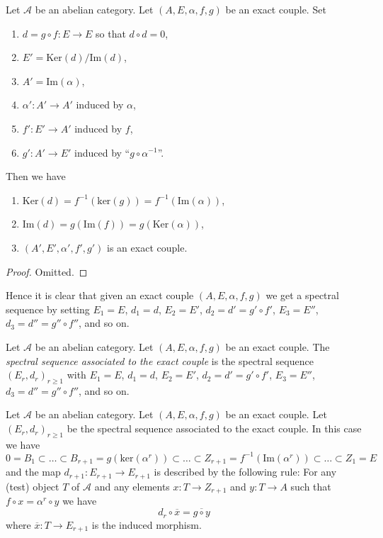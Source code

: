 \begin{lemma}
\label{lemma-derived-exact-couple}
Let $\mathcal{A}$ be an abelian category.
Let $(A, E, \alpha, f, g)$ be an exact couple.
Set
\begin{enumerate}
\item $d = g \circ f : E \to E$ so that $d \circ d = 0$,
\item $E' = \text{Ker}(d)/\text{Im}(d)$,
\item $A' = \text{Im}(\alpha)$,
\item $\alpha' : A' \to A'$ induced by $\alpha$,
\item $f' : E' \to A'$ induced by $f$,
\item $g' : A' \to E'$ induced by ``$g \circ \alpha^{-1}$''.
\end{enumerate}
Then we have
\begin{enumerate}
\item $\text{Ker}(d) = f^{-1}(\text{ker}(g)) = f^{-1}(\text{Im}(\alpha))$,
\item $\text{Im}(d) = g(\text{Im}(f)) = g(\text{Ker}(\alpha))$,
\item $(A', E', \alpha', f', g')$ is an exact couple.
\end{enumerate}
\end{lemma}

\begin{proof}
Omitted.
\end{proof}

\noindent
Hence it is clear that given an exact couple $(A, E, \alpha, f, g)$
we get a spectral sequence by setting $E_1 = E$, $d_1 = d$,
$E_2 = E'$, $d_2 = d' = g' \circ f'$, $E_3 = E''$, $d_3 = d'' = g'' \circ f''$,
and so on.

\begin{definition}
\label{definition-spectral-sequence-associated-exact-couple}
Let $\mathcal{A}$ be an abelian category.
Let $(A, E, \alpha, f, g)$ be an exact couple.
The {\it spectral sequence associated to the exact couple}
is the spectral sequence $(E_r, d_r)_{r \geq 1}$ with
$E_1 = E$, $d_1 = d$, $E_2 = E'$, $d_2 = d' = g' \circ f'$,
$E_3 = E''$, $d_3 = d'' = g'' \circ f''$,
and so on.
\end{definition}

\begin{lemma}
\label{lemma-spectral-sequence-associated-exact-couple}
Let $\mathcal{A}$ be an abelian category.
Let $(A, E, \alpha, f, g)$ be an exact couple.
Let $(E_r, d_r)_{r \geq 1}$ be the spectral sequence
associated to the exact couple.
In this case we have
$$
0 = B_1 \subset \ldots \subset
B_{r + 1} = g(\text{ker}(\alpha^r))
\subset \ldots \subset
Z_{r + 1} = f^{-1}(\text{Im}(\alpha^r))
\subset \ldots \subset Z_1 = E
$$
and the map $d_{r + 1} : E_{r + 1} \to E_{r + 1}$
is described by the following rule:
For any (test) object $T$ of $\mathcal{A}$ and any elements
$x : T \to Z_{r + 1}$ and $y : T \to A$ such that
$f \circ x = \alpha^r \circ y$ we have
$$
d_r \circ \overline{x} = \overline{g \circ y}
$$
where $\overline{x} : T \to E_{r + 1}$ is the
induced morphism.
\end{lemma}

